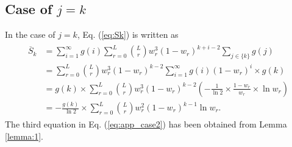 \documentclass[dvipdfmx,english]{ampmt} %
\begin{document}
\subsection{Case of $j=k$}
In the case of $j=k$, Eq. (\ref{eq:Sk}) is written as
\begin{align}\begin{split}\label{eq:app_case2}
  \overline{S}_{k} 
  &= \sum_{i=1}^{\infty} g(i) \sum_{r=0}^{L} \binom{L}{r} w_r^3 (1-w_r)^{k+i-2} \sum_{j \in \{k\}} g(j)\\
  &= \sum_{r=0}^{L} \binom{L}{r} w_r^3 (1-w_r)^{k-2} \sum_{i=1}^{\infty} g(i) (1-w_r)^{i} \times g(k) \\
  &= g(k) \times \sum_{r=0}^{L} \binom{L}{r} w_r^3 (1-w_r)^{k-2} \left( -\frac{1}{\ln 2} \times \frac{1-w_{r}}{w_{r}} \times \ln w_{r} \right) \\
  &= -\frac{g(k)}{\ln 2} \times \sum_{r=0}^{L} \binom{L}{r} w_r^2 (1-w_r)^{k-1} \ln w_{r}.
\end{split}\end{align}
The third equation in Eq. (\ref{eq:app_case2}) has been obtained from Lemma \ref{lemma:1}.
\end{document}

